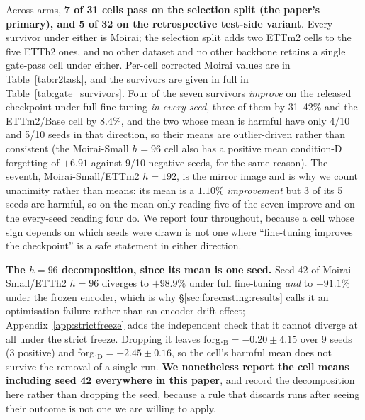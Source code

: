 \noindent Across arms, \textbf{7 of 31 cells pass on the selection split (the
paper's primary), and 5 of 32 on the retrospective test-side variant}. Every
survivor under either is Moirai; the selection split adds two ETTm2 cells to the
five ETTh2 ones, and no other dataset and no other backbone retains a single
gate-pass cell under either. Per-cell corrected
Moirai values are in Table~\ref{tab:r2task}, and the survivors are given in
full in Table~\ref{tab:gate_survivors}. Four of the seven survivors
\emph{improve} on the released checkpoint under full fine-tuning \emph{in every
seed}, three of them by
31--42\% and the ETTm2/Base cell by $8.4\%$,
and the two whose mean is harmful have only 4/10 and 5/10 seeds in that
direction, so their means are outlier-driven rather than consistent (the
Moirai-Small $h{=}96$ cell also has a positive mean condition-D forgetting of
$+6.91$ against 9/10 negative seeds, for the same reason).
The seventh, Moirai-Small/ETTm2 $h{=}192$, is the mirror image and is why we
count unanimity rather than means: its mean is a $1.10\%$ \emph{improvement} but
3 of its 5 seeds are harmful, so on the mean-only reading five of the seven
improve and on the every-seed reading four do. We report four throughout,
because a cell whose sign depends on which seeds were drawn is not one where
``fine-tuning improves the checkpoint'' is a safe statement in either direction.

\textbf{The $h{=}96$ decomposition, since its mean is one seed.}  Seed 42 of
Moirai-Small/ETTh2 $h{=}96$ diverges to $+98.9\%$ under full fine-tuning
\emph{and} to $+91.1\%$ under the frozen encoder, which is why
\S\ref{sec:forecasting:results} calls it an optimisation failure rather than an
encoder-drift effect; Appendix~\ref{app:strictfreeze} adds the independent check
that it cannot diverge at all under the strict freeze.  Dropping it leaves
forg.$_\text{B}{=}{-}0.20{\pm}4.15$ over 9 seeds (3 positive) and
forg.$_\text{D}{=}{-}2.45{\pm}0.16$, so the cell's harmful mean does not survive
the removal of a single run.  \textbf{We nonetheless report the cell means
including seed 42 everywhere in this paper}, and record the decomposition here
rather than dropping the seed, because a rule that discards runs after seeing
their outcome is not one we are willing to apply.


